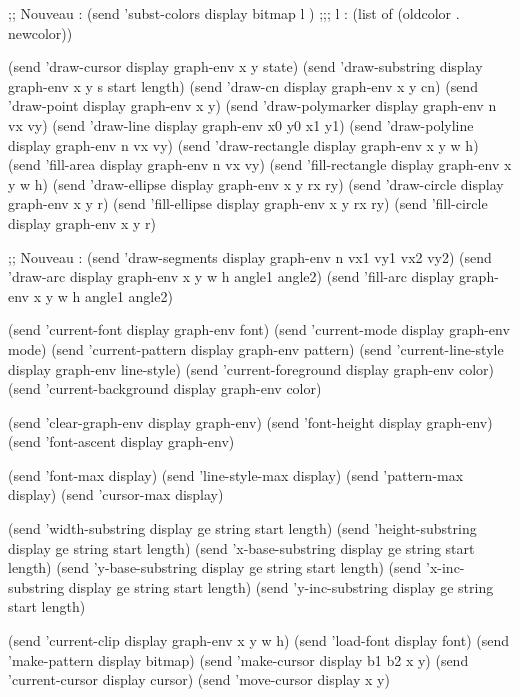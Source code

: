 ;; Nouveau :
(send 'subst-colors display bitmap l ) ;;; l : (list of (oldcolor . newcolor))
\EndLL


\BeginLL

(send 'draw-cursor display graph-env x y state)
(send 'draw-substring display graph-env x y s start length)
(send 'draw-cn display graph-env x y cn)
(send 'draw-point display graph-env x y)
(send 'draw-polymarker display graph-env n vx vy)
(send 'draw-line display graph-env x0 y0 x1 y1)
(send 'draw-polyline display graph-env n vx vy)
(send 'draw-rectangle display graph-env x y w h)
(send 'fill-area display graph-env n vx vy)
(send 'fill-rectangle display graph-env x y w h)
(send 'draw-ellipse display graph-env x y rx ry)
(send 'draw-circle display graph-env x y r)
(send 'fill-ellipse display graph-env x y rx ry)
(send 'fill-circle display graph-env x y r)

;; Nouveau :
(send 'draw-segments display graph-env n vx1 vy1 vx2 vy2)
(send 'draw-arc display graph-env x y w h angle1 angle2)
(send 'fill-arc display graph-env x y w h angle1 angle2)
\EndLL



\BeginLL
(send 'current-font display graph-env font)
(send 'current-mode display graph-env mode)
(send 'current-pattern display graph-env pattern)
(send 'current-line-style display graph-env line-style)
(send 'current-foreground display graph-env color)
(send 'current-background display graph-env color)

(send 'clear-graph-env display graph-env)
(send 'font-height display graph-env)
(send 'font-ascent display graph-env)

(send 'font-max display)
(send 'line-style-max display)
(send 'pattern-max display)
(send 'cursor-max display)

(send 'width-substring  display ge string start length)
(send 'height-substring display ge string start length)
(send 'x-base-substring display ge string start length)
(send 'y-base-substring display ge string start length)
(send 'x-inc-substring  display ge string start length)
(send 'y-inc-substring  display ge string start length)

(send 'current-clip display graph-env x y w h)
(send 'load-font display font)
(send 'make-pattern display bitmap)
(send 'make-cursor display b1 b2 x y)
(send 'current-cursor display cursor)
(send 'move-cursor display x y)

